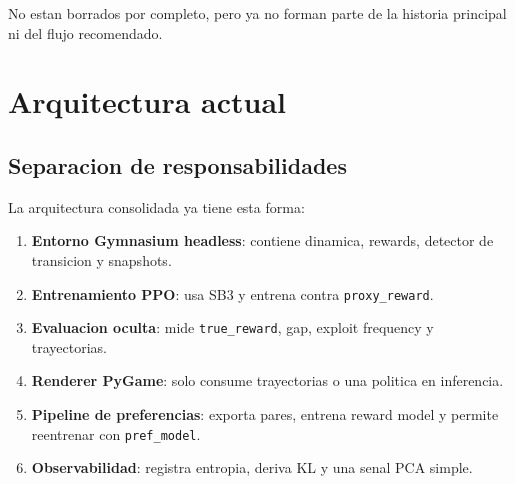 \documentclass[11pt]{article}
\begin{document}
No estan borrados por completo, pero ya no forman parte de la historia principal ni del flujo recomendado.

\section{Arquitectura actual}

\subsection{Separacion de responsabilidades}
La arquitectura consolidada ya tiene esta forma:
\begin{enumerate}
    \item \textbf{Entorno Gymnasium headless}: contiene dinamica, rewards, detector de transicion y snapshots.
    \item \textbf{Entrenamiento PPO}: usa SB3 y entrena contra \texttt{proxy\_reward}.
    \item \textbf{Evaluacion oculta}: mide \texttt{true\_reward}, gap, exploit frequency y trayectorias.
    \item \textbf{Renderer PyGame}: solo consume trayectorias o una politica en inferencia.
    \item \textbf{Pipeline de preferencias}: exporta pares, entrena reward model y permite reentrenar con \texttt{pref\_model}.
    \item \textbf{Observabilidad}: registra entropia, deriva KL y una senal PCA simple.
\end{enumerate}
\end{document}
